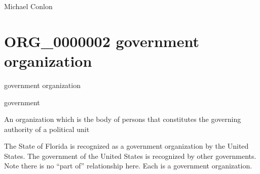\documentclass[letterpaper,10pt,english]{sphinxmanual}
\begin{document}
\begin{sphinxShadowBox}

\sphinxAtStartPar
Michael Conlon 
\end{sphinxShadowBox}
\begin{quote}
\label{\detokenize{doc-ORG_0000002:org-0000002}}\label{\detokenize{doc-ORG_0000002:government-organization}}\label{\detokenize{doc-ORG_0000002:org-0000002}}
\ignorespaces \end{quote}


\section{ORG\_0000002 \sphinxhyphen{} government organization}
\label{\detokenize{doc-ORG_0000002:org-0000002-government-organization}}\label{\detokenize{doc-ORG_0000002:index-0}}\label{\detokenize{doc-ORG_0000002::doc}}
\begin{sphinxShadowBox}

\sphinxAtStartPar
government organization
\end{sphinxShadowBox}

\begin{sphinxShadowBox}

\sphinxAtStartPar
government
\end{sphinxShadowBox}

\begin{sphinxShadowBox}

\sphinxAtStartPar
An organization which is the body of persons that constitutes the governing authority of a political unit
\end{sphinxShadowBox}

\begin{sphinxShadowBox}

\sphinxAtStartPar
{}
\end{sphinxShadowBox}

\begin{sphinxShadowBox}

\sphinxAtStartPar
The State of Florida is recognized as a government organization by the United States.  The government of the United States is recognized by other governments.  Note there is no “part of” relationship here.  Each is a government organization.
\end{sphinxShadowBox}
\end{document}
